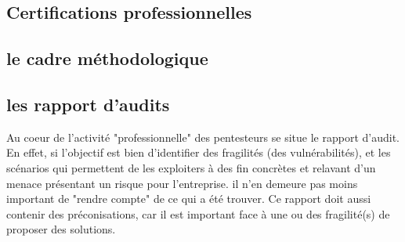 \subsection {Certifications professionnelles}

\subsection {le cadre méthodologique}


\subsection {les rapport d'audits}

Au coeur de l'activité "professionnelle" des pentesteurs se situe le rapport d'audit.
En effet, si l'objectif est bien d'identifier des fragilités (des vulnérabilités), et les scénarios qui permettent de les exploiters à des fin concrètes et relavant d'un menace présentant un risque pour l'entreprise.
il n'en demeure pas moins important  de "rendre compte" de ce qui a été trouver. Ce rapport doit aussi contenir des préconisations, car il est important face à une ou des fragilité(s) de proposer des solutions. 




